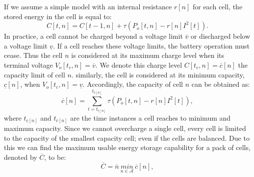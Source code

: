 \documentclass[10pt,twocolumn]{IEEEtran}
\begin{document}
If we assume a simple model with an internal resistance $r[n]$ for each cell, the stored energy in the cell is equal to:
%
\begin{equation}
C[t,n]=C[t-1,n] +  \tau(P_{o}[t,n] - r[n]I^2[t]).
\label{energycell}
\end{equation}
%
\noindent In practice,  a cell cannot be charged beyond a voltage limit $\overline{v}$ or discharged below a voltage limit $\underline{v}$.
If a cell reaches these voltage limits, the battery operation must cease.
Thus the cell $n$ is considered at its maximum charge level when its terminal voltage $V_{o}[t_c,n]=\overline{v}$.
We denote this charge level $C[t_c,n]=\overline{c}[n]$  the capacity limit of cell $n$.
similarly, the cell is considered at its minimum capacity, $\underline{c}[n]$, when $V_{o}[t_c,n]=\underline{v}$.
Accordingly, the capacity of cell $n$ can be obtained  as:
%
\begin{equation}
\overline{c}[n]=   \sum_{t=t_{\underline{c}[n]}}^{t_{\overline{c}[n]} } \tau(P_{o}[t,n] - r[n]I^2[t]),
\end{equation}
\noindent where $t_{\underline{c}[n]}$ and $t_{\overline{c}[n]}$ are the time instances a cell reaches to minimum and maximum capacity.
Since we cannot overcharge a single cell, every cell is limited to the capacity of the smallest capacity cell; even if the cells are balanced.
Due to this we can find the maximum usable energy storage capability for a pack of cells, denoted by $ \overline{C}$,  to be:
%
\begin{equation}
\overline{C}=\overline{n} \ \underset{n\in \mathcal{A}}{min} \ \overline{c}[n] ,
\label{eq:lhscap}
\end{equation}
\end{document}
